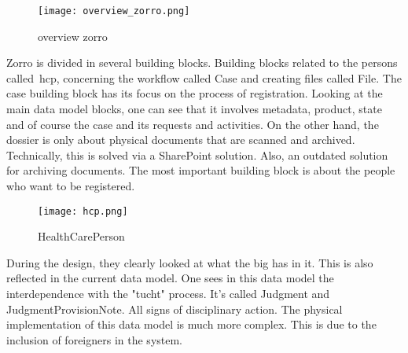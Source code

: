 \begin{wrapfigure} {r}{0.3\textwidth} 
\texttt{[image: overview\_zorro.png]}
\caption{overview zorro}
\label{fig:overview_zorro}
\end{wrapfigure}
Zorro is divided in several building blocks.
Building blocks related to the persons called~\acrfull{hcp}, concerning the workflow called Case and creating files called File.
The case building block has its focus on the process of registration. 
Looking at the main data model blocks, one can see that it involves metadata, product, state and of course the case and its requests and activities.
On the other hand, the dossier is only about physical documents that are scanned and archived.
Technically, this is solved via a SharePoint solution.
Also, an outdated solution for archiving documents.
The most important building block is about the people who want to be registered.
\begin{figure}
    \centering
    \texttt{[image: hcp.png]}
    \caption{HealthCarePerson}
    \label{fig:hcp}
\end{figure}
During the design, they clearly looked at what the \acrshort{big} has in it.
This is also reflected in the current data model.
One sees in this data model the interdependence with the "tucht" process.
It's called Judgment and JudgmentProvisionNote.
All signs of disciplinary action.
The physical implementation of this data model is much more complex.
This is due to the inclusion of foreigners in the system.

